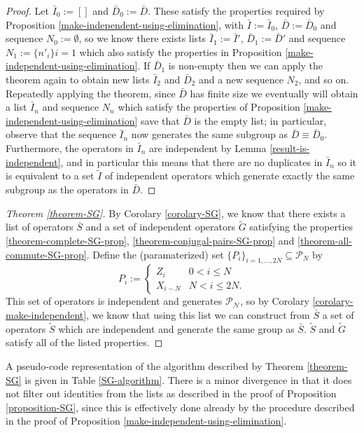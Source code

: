 \documentclass[twocolumn,showpacs,preprintnumbers,amsmath,amssymb,nofootinbib,pra,floatfix]{revtex4}
\newenvironment{remark}[1][Remark]{\begin{trivlist}
\item[\hskip \labelsep {\bfseries #1}]}{\end{trivlist}}
\newcommand{\lst}{\bar}
\newcommand{\set}{\tilde}
\begin{document}
\begin{proof}
Let $\lst I_0 := []$ and $\lst D_0 := \lst D$.  These satisfy the properties required by Proposition \ref{make-independent-using-elimination}, with $\lst I:=\lst I_0$, $\lst D:=\lst D_0$ and sequence $N_0:=\emptyset$, so we know there exists lists $\lst I_1:=\lst I'$, $\lst D_1:=\lst D'$ and sequence $N_1:=\{n'_{i}\}{i=1}$ which also satisfy the properties in Proposition \ref{make-independent-using-elimination}.  If $\lst D_1$ is non-empty then we can apply the theorem again to obtain new lists $\lst I_2$ and $\lst D_2$ and a new sequence $N_2$, and so on.  Repeatedly applying the theorem, since $\lst D$ has finite size we eventually will obtain a list $\lst I_n$ and sequence $N_n$ which satisfy the properties of Proposition \ref{make-independent-using-elimination} save that $\lst D$ is the empty list;  in particular, observe that the sequence $\lst I_n$ now generates the same subgroup as $\lst D\equiv \lst D_0$.  Furthermore, the operators in $\lst I_n$ are independent by Lemma \ref{result-is-independent}, and in particular this means that there are no duplicates in $\lst I_n$ so it is equivalent to a set $\set I$ of independent operators which generate exactly the same subgroup as the operators in $\lst D$.
\end{proof}
\begin{proof}[Theorem \ref{theorem-SG}]
By Corolary \ref{corolary-SG}, we know that there exists a list of operators $\lst S$ and a set of independent operators $\set G$ satisfying the properties \ref{theorem-complete-SG-prop}, \ref{theorem-conjugal-pairs-SG-prop} and \ref{theorem-all-commute-SG-prop}.  Define the (paramaterized) set $\{P_i\}_{i=1,\dots,2N}\subseteq \mathscr{P}_N$ by
$$
P_i :=
\begin{cases}
Z_i & 0 < i \le N \\
X_{i-N} & N < i \le 2N.
\end{cases}
$$  This set of operators is independent and generates $\mathscr{P_N}$, so by Corolary \ref{corolary-make-independent}, we know that using this list we can construct from $\lst S$ a set of operators $\set S$ which are independent and generate the same group as $\lst S$.  $\set S$ and $\set G$ satisfy all of the listed properties.
\end{proof}
\begin{remark}
A pseudo-code representation of the algorithm described by Theorem \ref{theorem-SG} is given in Table  \ref{SG-algorithm}.  There is a minor divergence in that it does not filter out identities from the lists as described in the proof of Proposition \ref{proposition-SG}, since this is effectively done already by the procedure described in the proof of Proposition \ref{make-independent-using-elimination}.
\end{remark}
\end{document}
